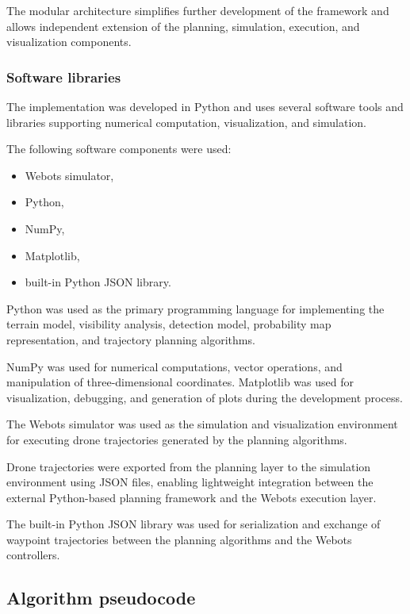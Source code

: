 \documentclass[english]{projectreport}
\begin{document}
The modular architecture simplifies further development of the framework and allows independent extension of the planning, simulation, execution, and visualization components.

\newpage

\subsubsection{Software libraries}

The implementation was developed in Python and uses several software tools and libraries supporting numerical computation, visualization, and simulation.

The following software components were used:
\begin{itemize}
    \item Webots simulator,
    \item Python,
    \item NumPy,
    \item Matplotlib,
    \item built-in Python JSON library.
\end{itemize}

Python was used as the primary programming language for implementing the terrain model, visibility analysis, detection model, probability map representation, and trajectory planning algorithms.

NumPy was used for numerical computations, vector operations, and manipulation of three-dimensional coordinates. Matplotlib was used for visualization, debugging, and generation of plots during the development process.

The Webots simulator was used as the simulation and visualization environment for executing drone trajectories generated by the planning algorithms.

Drone trajectories were exported from the planning layer to the simulation environment using JSON files, enabling lightweight integration between the external Python-based planning framework and the Webots execution layer.

The built-in Python JSON library was used for serialization and exchange of waypoint trajectories between the planning algorithms and the Webots controllers.

\subsection{Algorithm pseudocode}
\end{document}

